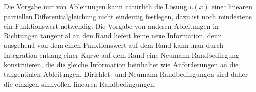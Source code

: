 Die Vorgabe nur von Ableitungen kann natürlich die Lösung $u(x)$
einer linearen partiellen Differentialgleichung nicht eindeutig
festlegen, dazu ist noch mindestens ein Funktionswert notwendig.
Die Vorgabe von anderen Ableitungen in Richtungen tangential an den
Rand liefert keine neue Information, denn ausgehend von dem einen
Funktionswert auf dem Rand kann man durch Integration entlang
einer Kurve auf dem Rand eine Neumann-Randbedingung konstruieren,
die die gleiche Information beinhaltet wie Anforderungen an die
tangentialen Ableitungen.
Dirichlet- und Neumann-Randbedingungen sind daher die einzigen
sinnvollen linearen Randbedingungen.

